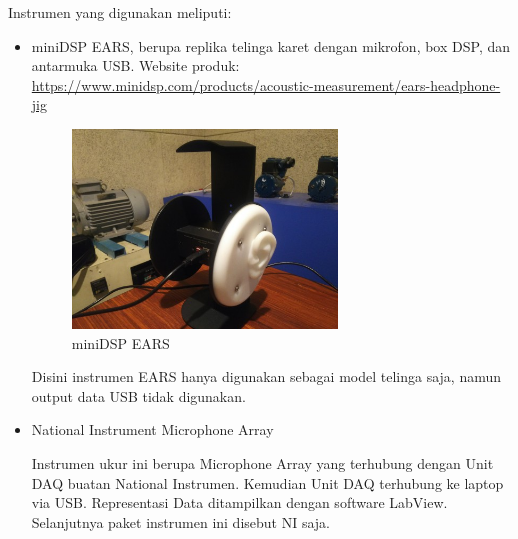 \documentclass[12pt,]{article}
\begin{document}
	Instrumen yang digunakan meliputi:
	\begin{itemize}
		\item miniDSP EARS, berupa replika telinga karet dengan mikrofon, box DSP, dan antarmuka USB.
		Website produk:\\
		\url{https://www.minidsp.com/products/acoustic-measurement/ears-headphone-jig}

		\begin{figure}[!ht]
			\centering
			\includegraphics[width=200pt]{images/ears}
			\caption{miniDSP EARS}
		\end{figure}

		Disini instrumen EARS hanya digunakan sebagai model telinga saja,
		namun output data USB tidak digunakan.

		\item National Instrument Microphone Array

		Instrumen ukur ini berupa Microphone Array yang terhubung dengan Unit DAQ buatan National Instrumen.
		Kemudian Unit DAQ terhubung ke laptop via USB.
		Representasi Data ditampilkan dengan software LabView.
		Selanjutnya paket instrumen ini disebut NI saja.


\end{itemize}
\end{document}
